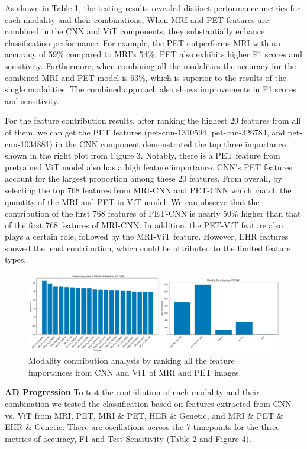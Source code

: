 As shown in Table 1, the testing results revealed distinct performance metrics for each modality and their combinations, When MRI and PET features are combined in the CNN and ViT components, they substantially enhance classification performance. For example, the PET outperforms MRI with an accuracy of 59\% compared to MRI’s 54\%. PET also exhibits higher F1 scores and sensitivity. Furthermore, when combining all the modalities the accuracy for the combined MRI and PET model is 63\%, which is superior to the results of the single modalities. The combined approach also shows improvements in F1 scores and sensitivity. 

For the feature contribution results, after ranking the highest 20 features from all of them, we can get the PET features (pet-cnn-1310594, pet-cnn-326784, and pet-cnn-1034881) in the CNN component demonstrated the top three importance shown in the right plot from Figure 3. Notably, there is a PET feature from pretrained ViT model also has a high feature importance. CNN’s PET features account for the largest proportion among these 20 features. From overall, by selecting the top 768 features from MRI-CNN and PET-CNN which match the quantity of the MRI and PET in ViT model. We can observe that the contribution of the first 768 features of PET-CNN is nearly 50\% higher than that of the first 768 features of MRI-CNN. In addition, the PET-ViT feature also plays a certain role, followed by the MRI-ViT feature. However, EHR features showed the least contribution, which could be attributed to the limited feature types. 

  \begin{figure}
     \centering
     \includegraphics[width=1\linewidth]{figs/Picture16.png}
     \caption{Modality contribution analysis by ranking all the feature importances from CNN and ViT of MRI and PET images. }
    \label{fig:enter-label}
 \end{figure}
 
\textbf{AD Progression}
To test the contribution of each modality and their combination we tested the classification based on features extracted from CNN vs. ViT from MRI, PET, MRI \& PET, HER \& Genetic, and MRI \& PET \& EHR \& Genetic. There are oscillations across the 7 timepoints for the three metrics of accuracy, F1 and Test Sensitivity (Table 2 and Figure 4).  

